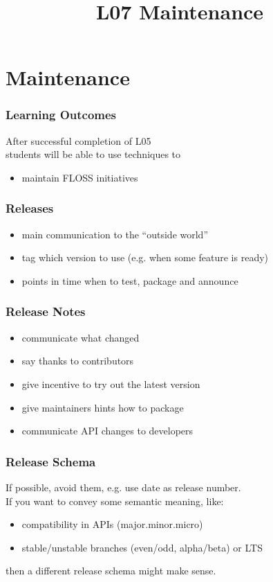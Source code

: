 

\title{L07 Maintenance}



\section{Maintenance}

\begin{frame}
	\frametitle{Learning Outcomes}
	After successful completion of L05 \\
	students will be able to
	use techniques to

	\begin{itemize}
	\item maintain FLOSS initiatives
	\end{itemize}
\end{frame}

\begin{frame}
	\frametitle{Releases}

	\begin{itemize}[<+-| alert@+>]
	\item main communication to the ``outside world''
	\item tag which version to use (e.g. when some feature is ready)
	\item points in time when to test, package and announce
	\end{itemize}
\end{frame}

\begin{frame}
	\frametitle{Release Notes}

	\begin{itemize}[<+-| alert@+>]
	\item communicate what changed
	\item say thanks to contributors
	\item give incentive to try out the latest version
	\item give maintainers hints how to package
	\item communicate API changes to developers
	\end{itemize}
\end{frame}

\begin{frame}
	\frametitle{Release Schema}

	If possible, avoid them, e.g. use date as release number. \\
	If you want to convey some semantic meaning, like:

	\begin{itemize}[<+-| alert@+>]
	\item compatibility in APIs (major.minor.micro)
	\item stable/unstable branches (even/odd, alpha/beta) or LTS
	\end{itemize}

	\pause[\thebeamerpauses]  %

	then a different release schema might make sense.
\end{frame}

